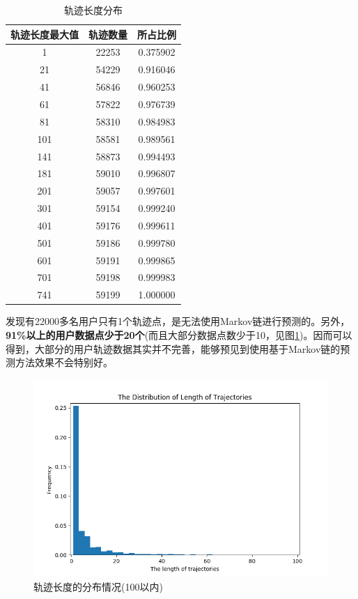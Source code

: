 \documentclass[11pt,twocolumn]{article}
\begin{document}
\begin{table}[!htbp]
  \centering  
  \begin{tabular}{c|c|c} 
  \hline
    轨迹长度最大值 & 轨迹数量 & 所占比例 \\ \hline
	1	& 	22253	& 	0.375902\\
	21	&	54229	&	0.916046\\
	41	&  	56846	& 	0.960253\\
	61	& 	57822	&	0.976739\\
	81	&  	58310 	&	0.984983\\
	101	&	58581   & 	0.989561\\
	141	&  	58873 	&  	0.994493\\
	181	&	59010	&  	0.996807\\
	201	&  	59057   & 	0.997601\\
	301	&  	59154 	&  	0.999240\\
	401	&  	59176 	& 	0.999611\\
	501	&  	59186 	& 	0.999780\\
	601	&  	59191  	& 	0.999865\\
	701	& 	59198  	& 	0.999983\\
	741 & 	59199  	& 	1.000000\\
  \hline
  \end{tabular}
\caption{轨迹长度分布}
\label{dist}
\end{table}

发现有22000多名用户只有1个轨迹点，是无法使用Markov链进行预测的。另外，\textbf{91\%以上的用户数据点少于20个}(而且大部分数据点数少于10，见图\ref{hist})。因而可以得到，大部分的用户轨迹数据其实并不完善，能够预见到使用基于Markov链的预测方法效果不会特别好。

\begin{figure}[!htbp]
    \centering
    \includegraphics[scale=0.4]{hist.png}
    \caption{轨迹长度的分布情况(100以内)}
    \label{hist}
\end{figure}
\end{document}
